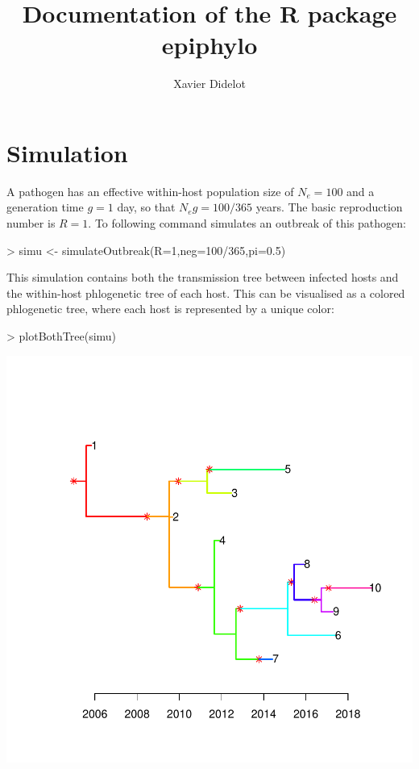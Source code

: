 \documentclass[a4paper]{article}
\title{Documentation of the R package epiphylo}
\author{Xavier Didelot}
\begin{document}


\maketitle


\section{Simulation}

A pathogen has an effective within-host population size of $N_e=100$ and a generation time $g=1$ day, so that $N_e g=100/365$ years. The basic reproduction number is $R=1$. To following command simulates an outbreak of this pathogen: 
\begin{Schunk}
\begin{Sinput}
> simu <- simulateOutbreak(R=1,neg=100/365,pi=0.5)
\end{Sinput}
\end{Schunk}

This simulation contains both the transmission tree between infected hosts and the within-host phlogenetic tree of each host. This can be visualised as a colored phlogenetic tree, where each host is represented by a unique color:

\begin{center}
\begin{Schunk}
\begin{Sinput}
> plotBothTree(simu)
\end{Sinput}
\end{Schunk}
\includegraphics{epiphylo-003}
\end{center}
\end{document}
